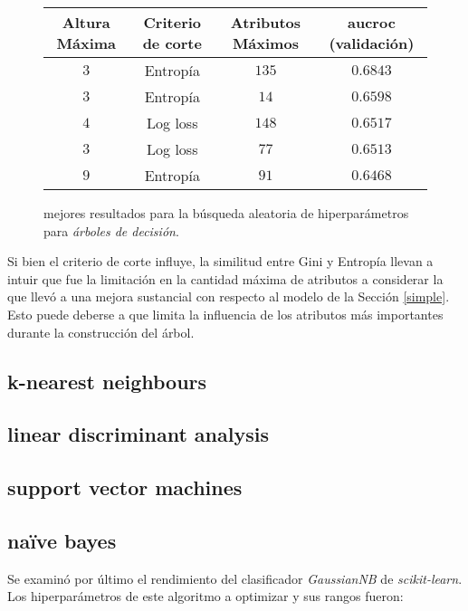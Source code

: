 \vspace{0.5em}
\begin{figure}[!htbp]
    \begin{center}
        \begin{tabular}{ |c|c|c|c| } 
         \hline
        Altura Máxima   & Criterio de corte & Atributos Máximos  & aucroc (validación) \\
        \hline
        $3$             & Entropía          &  $135$            & $0.6843$  \\ 
        $3$             & Entropía          &  $14$             & $0.6598$  \\
        $4$             & Log loss          &  $148$            & $0.6517$  \\ 
        $3$             & Log loss          &  $77$             & $0.6513$  \\
        $9$             & Entropía          &  $91$             & $0.6468$  \\ 
        \hline
        \end{tabular}
    \end{center}
    \caption{mejores resultados para la búsqueda aleatoria de hiperparámetros para \textit{árboles de decisión}.} \label{random_tree}
\end{figure}

Si bien el criterio de corte influye, la similitud entre Gini y Entropía llevan a intuir que fue la limitación en la cantidad máxima de atributos a considerar la que llevó a una mejora sustancial con respecto al modelo de la Sección \ref{simple}. Esto puede deberse a que limita la influencia de los atributos más importantes durante la construcción del árbol.

\subsection{k-nearest neighbours}
\subsection{linear discriminant analysis}
\subsection{support vector machines}
\subsection{naïve bayes}
Se examinó por último el rendimiento del clasificador \textit{GaussianNB} de \textit{scikit-learn}. Los hiperparámetros de este algoritmo a optimizar y sus rangos fueron:

